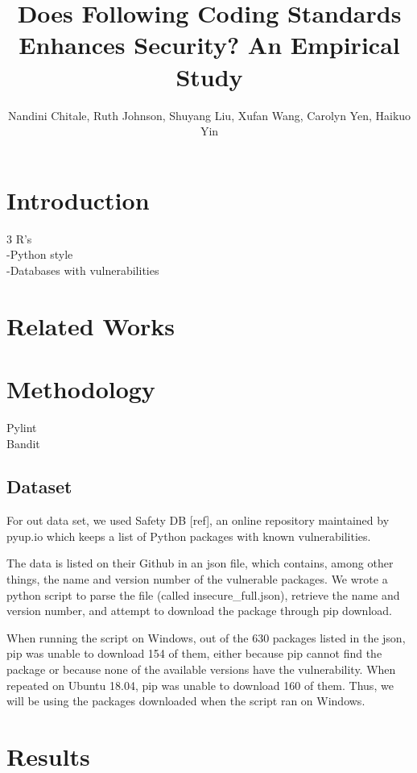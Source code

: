 \documentclass[sigconf]{acmart}
\title{Does Following Coding Standards Enhances Security? An Empirical Study}
\author{Nandini Chitale, Ruth Johnson, Shuyang Liu, Xufan Wang, Carolyn Yen, Haikuo Yin}
\begin{document}
\maketitle

\begin{abstract}
      
\end{abstract}
\section{Introduction}
3 R's\\
-Python style\\
-Databases with vulnerabilities\\
\section{Related Works}

\section{Methodology}
Pylint\\
Bandit\\
\subsection{Dataset}
For out data set, we used Safety DB [ref], an online repository maintained by pyup.io which keeps a list of Python packages with known vulnerabilities. 

The data is listed on their Github in an json file, which contains, among other things, the name and version number of the vulnerable packages. We wrote a python script to parse the file (called insecure\_full.json), retrieve the name and version number, and attempt to download the package through pip download.

When running the script on Windows, out of the 630 packages listed in the json, pip was unable to download 154 of them, either because pip cannot find the package or because none of the available versions have the vulnerability. When repeated on Ubuntu 18.04, pip was unable to download 160 of them. Thus, we will be using the packages downloaded when the script ran on Windows.

\section{Results}
\end{document}
